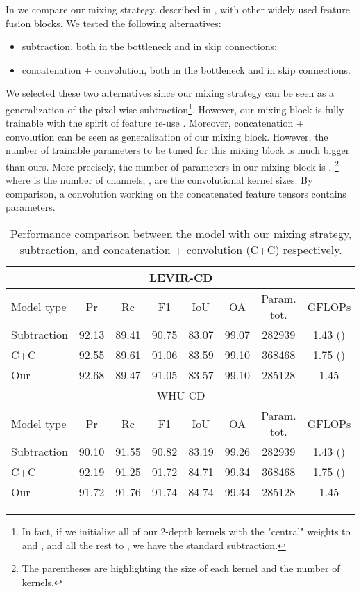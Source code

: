 In  we compare our mixing strategy, described in , 
with other widely used feature fusion blocks. We tested the following alternatives:
\begin{itemize}
    \item subtraction, both in the bottleneck and in skip connections;
    \item concatenation + convolution, both in the bottleneck and in skip connections.
\end{itemize}
We selected these two alternatives since our mixing strategy can be seen as a generalization of the pixel-wise subtraction\footnote{
    In fact, if we initialize all of our 2-depth kernels with the "central" weights to  and , 
    and all the rest to , we have the standard subtraction.
}.
However, our mixing block  is fully trainable with the spirit of feature re-use \cite{bengio2013representation}.
Moreover, concatenation + convolution can be seen as generalization of our mixing block. 
However, the number of trainable parameters to be tuned for this mixing block is much bigger than ours.
More precisely, the number of parameters in our mixing block is ,
\footnote{
    The parentheses are highlighting the size of each kernel and the number of kernels.
}
where  is the number of channels, ,  are the convolutional kernel sizes.
By comparison, a convolution working on the concatenated feature tensors contains  parameters.
 
\begin{table}[!ht]
    \caption{
        Performance comparison between the model with our mixing strategy, subtraction, and concatenation + convolution (C+C) respectively.
    }
    \centering
    \begin{tabular}{l|ccccc|cc}
    \hline 
    \multicolumn{8}{c}{LEVIR-CD} \\
    \hline
        Model type & Pr & Rc & F1 & IoU & OA & Param. tot. & GFLOPs  \\
        \hline 
        Subtraction & 92.13 & 89.41 & 90.75 & 83.07 & 99.07 & 282939 & 1.43 () \\ 
        C+C & 92.55 & 89.61 & 91.06 & 83.59 & 99.10 & 368468 & 1.75 () \\
        \hline
        Our & 92.68 & 89.47 & 91.05 & 83.57 & 99.10 & 285128 & 1.45 \\
        \hline
        \multicolumn{8}{c}{WHU-CD} \\
        \hline
        Model type & Pr & Rc & F1 & IoU & OA & Param. tot. & GFLOPs  \\
        \hline
        Subtraction & 90.10 & 91.55 & 90.82 & 83.19 & 99.26 & 282939 & 1.43 () \\
        C+C & 92.19 & 91.25 & 91.72 & 84.71 & 99.34 & 368468 & 1.75 () \\
        \hline
        Our & 91.72 & 91.76 & 91.74 & 84.74 & 99.34 & 285128 & 1.45 \\
        \hline
    \end{tabular}
    \label{tab:groupedvsconv}
\end{table}

